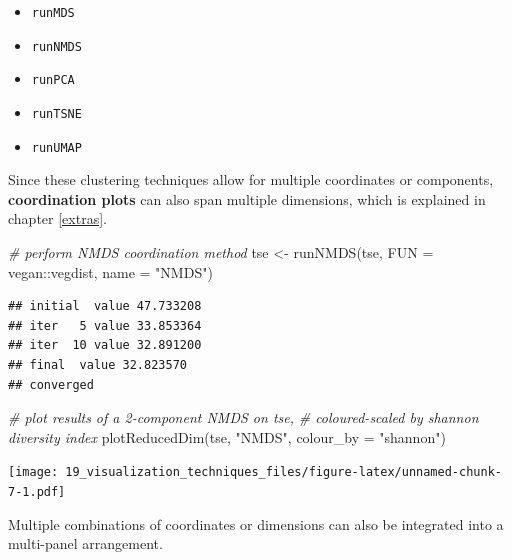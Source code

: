 \documentclass[
]{book}
\newenvironment{Shaded}{\begin{snugshade}}{\end{snugshade}}
\newcommand{\AttributeTok}[1]{\textcolor[rgb]{0.77,0.63,0.00}{#1}}
\newcommand{\CommentTok}[1]{\textcolor[rgb]{0.56,0.35,0.01}{\textit{#1}}}
\newcommand{\FunctionTok}[1]{\textcolor[rgb]{0.00,0.00,0.00}{#1}}
\newcommand{\NormalTok}[1]{#1}
\newcommand{\OtherTok}[1]{\textcolor[rgb]{0.56,0.35,0.01}{#1}}
\newcommand{\SpecialCharTok}[1]{\textcolor[rgb]{0.00,0.00,0.00}{#1}}
\newcommand{\StringTok}[1]{\textcolor[rgb]{0.31,0.60,0.02}{#1}}
\providecommand{\tightlist}{%
  \setlength{\itemsep}{0pt}\setlength{\parskip}{0pt}}
\begin{document}
\begin{itemize}
\tightlist
\item
  \texttt{runMDS}
\item
  \texttt{runNMDS}
\item
  \texttt{runPCA}
\item
  \texttt{runTSNE}
\item
  \texttt{runUMAP}
\end{itemize}

Since these clustering techniques allow for multiple coordinates or components,
\textbf{coordination plots} can also span multiple dimensions, which is explained in chapter \ref{extras}.

\begin{Shaded}
\begin{Highlighting}[]
\CommentTok{\# perform NMDS coordination method}
\NormalTok{tse }\OtherTok{\textless{}{-}} \FunctionTok{runNMDS}\NormalTok{(tse,}
               \AttributeTok{FUN =}\NormalTok{ vegan}\SpecialCharTok{::}\NormalTok{vegdist,}
               \AttributeTok{name =} \StringTok{"NMDS"}\NormalTok{)}
\end{Highlighting}
\end{Shaded}

\begin{verbatim}
## initial  value 47.733208 
## iter   5 value 33.853364
## iter  10 value 32.891200
## final  value 32.823570 
## converged
\end{verbatim}

\begin{Shaded}
\begin{Highlighting}[]
\CommentTok{\# plot results of a 2{-}component NMDS on tse,}
\CommentTok{\# coloured{-}scaled by shannon diversity index}
\FunctionTok{plotReducedDim}\NormalTok{(tse, }\StringTok{"NMDS"}\NormalTok{, }\AttributeTok{colour\_by =} \StringTok{"shannon"}\NormalTok{)}
\end{Highlighting}
\end{Shaded}

\texttt{[image: 19\_visualization\_techniques\_files/figure-latex/unnamed-chunk-7-1.pdf]}

Multiple combinations of coordinates or dimensions can also be integrated into a multi-panel arrangement.
\end{document}
